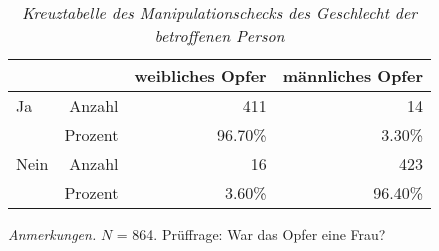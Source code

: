\begin{table}[htb]
    \caption[Kreuztabelle Manipulationscheck Opfergeschlecht]{\textit {Kreuztabelle des Manipulationschecks des Geschlecht der betroffenen Person}} 
    \label{KT_sex}
    \centering
    \begin{adjustbox}{width=\textwidth}
    \small
    \begin{tabular}{lrrr}
      \hline
        &   & weibliches Opfer & männliches Opfer \\
      \hline
    Ja   & Anzahl  & 411      & 14      \\
         & Prozent & 96.70\%  & 3.30\%  \\
    Nein & Anzahl  & 16       & 423     \\
         & Prozent & 3.60\%   & 96.40\% \\
       \hline
    \end{tabular}
    \end{adjustbox}
    
    \begin{tablenotes}
        \item \textit{Anmerkungen.} \( N \) = 864. Prüffrage: War das Opfer eine Frau?
      \end{tablenotes}
    \end{table}
